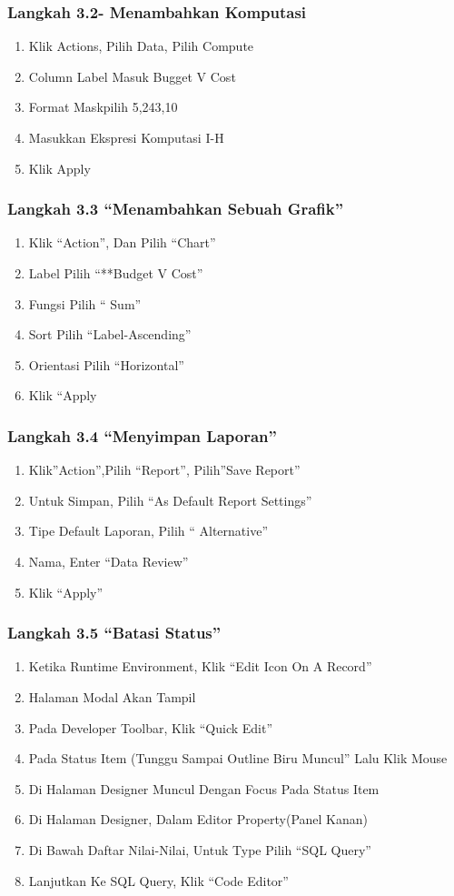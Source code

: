 \documentclass{article}
\begin{document}
\subsubsection{Langkah 3.2- Menambahkan Komputasi}
\begin{enumerate}
    \item Klik Actions, Pilih Data, Pilih Compute
    \item Column Label Masuk Bugget V Cost
    \item Format Maskpilih 5,243,10
    \item Masukkan Ekspresi Komputasi I-H
    \item Klik Apply
    \end{enumerate}
\subsubsection{Langkah 3.3 “Menambahkan Sebuah Grafik”}
\begin{enumerate}
    \item Klik “Action”, Dan Pilih “Chart”
    \item Label Pilih “**Budget V Cost”
    \item Fungsi Pilih “ Sum”
    \item Sort Pilih “Label-Ascending”
    \item Orientasi Pilih “Horizontal”
    \item Klik “Apply
    \end{enumerate}
\subsubsection{Langkah 3.4 “Menyimpan Laporan”}
\begin{enumerate}
    \item Klik”Action”,Pilih “Report”, Pilih”Save Report”
    \item Untuk Simpan, Pilih “As Default Report Settings”
    \item Tipe Default Laporan, Pilih “ Alternative”
    \item Nama, Enter “Data Review”
    \item Klik “Apply”
    \end{enumerate}
\subsubsection{Langkah 3.5 “Batasi Status”}
\begin{enumerate}
    \item Ketika Runtime Environment, Klik “Edit Icon On A Record”
    \item Halaman Modal Akan Tampil
    \item Pada Developer Toolbar, Klik “Quick Edit”
    \item Pada Status Item (Tunggu Sampai Outline Biru Muncul” Lalu Klik Mouse
    \item Di Halaman Designer Muncul Dengan Focus Pada Status Item
	\item Di Halaman Designer, Dalam Editor Property(Panel Kanan)
    \item Di Bawah Daftar Nilai-Nilai, Untuk Type Pilih “SQL Query”
    \item Lanjutkan Ke SQL Query, Klik “Code Editor”
    \end{enumerate}
\end{document}
